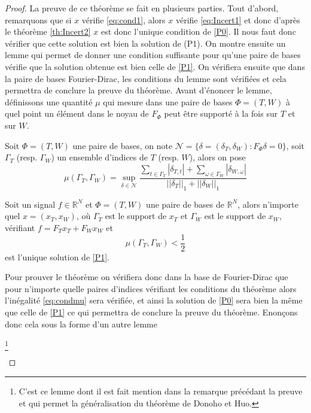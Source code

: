 \begin{proof}
	La preuve de ce théorème se fait en plusieurs parties.
	Tout d'abord, remarquons que si $x$ vérifie \ref{eq:cond1}, alors $x$ vérifie \ref{eq:Incert1} et donc d'après le théorème \ref{th:Incert2} $x$ est donc l'unique condition de \ref{P0}.
	Il nous faut donc vérifier que cette solution est bien la solution de (P1).
	On montre ensuite un lemme qui permet de donner une condition suffisante pour qu'une paire de bases vérifie que la solution obtenue est bien celle de \ref{P1}.
	On vérifiera ensuite que dans la paire de bases Fourier-Dirac, les conditions du lemme sont vérifiées et cela permettra de conclure la preuve du théorème.
	Avant d'énoncer le lemme, définissons une quantité $\mu$ qui mesure dans une paire de bases $\Phi=(T,W)$ à quel point un élément dans le noyau de $F_\Phi$ peut être supporté à la fois sur $T$ et sur $W$.
	\begin{definition}
		Soit $\Phi = (T,W)$ une paire de bases, on note $\mathcal{N} = \{\delta = (\delta_T, \delta_W): F_\Phi \delta = 0\}$, soit $\Gamma_T$ (resp. $\Gamma_W$) un ensemble d'indices de $T$ (resp. $W$), alors on pose
		\begin{equation}
			\mu(\Gamma_T, \Gamma_W) = \sup_{\delta \in \mathcal{N}} \frac{\sum_{t \in \Gamma_T} |\delta_{T,t}| + \sum_{\omega \in \Gamma_W} |\delta_{W,\omega}|  }{||\delta_T||_1 + ||\delta_W||_1 }
		\end{equation}
	\end{definition}
	\begin{lemme}\label{th:muP1}
		Soit un signal $f \in \mathbb{R}^N$ et $\Phi=(T,W)$ une paire de bases de $\mathbb{R}^N$, alors n'importe quel $x = (x_T, x_W)$, où $\Gamma_T$ est le support de $x_T$ et $\Gamma_W$ est le support de $x_W$, 	vérifiant $f = F_T x_T + F_W x_W$ et
		\begin{equation}\label{eq:condmu}
			\mu(\Gamma_T, \Gamma_W) < \frac{1}{2}
		\end{equation}
		est l'unique solution de \ref{P1}.
	\end{lemme}
	Pour prouver le théorème on vérifiera donc dans la base de Fourier-Dirac que pour n'importe quelle paires d'indices vérifiant les conditions du théorème alors l'inégalité \ref{eq:condmu} sera vérifiée, et ainsi la solution de \ref{P0} sera bien la même que celle de \ref{P1} ce qui permettra de conclure la preuve du théorème.
	Enonçons donc cela sous la forme d'un autre lemme
	\begin{lemme}\label{th:muFD}\footnote{C'est ce lemme dont il est fait mention dans la remarque précédant la preuve et qui permet la généralisation du théorème de Donoho et Huo.}

\end{lemme}
\end{proof}
